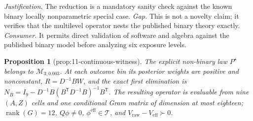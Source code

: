 \documentclass{article}
\newtheorem{proposition}{Proposition}
\begin{document}
\par\smallskip\noindent \textit{Justification.} The reduction is a mandatory sanity check against the known binary locally nonparametric special case. \textit{Gap.} This is not a novelty claim; it verifies that the multilevel operator nests the published binary theory exactly. \textit{Consumer.} It permits direct validation of software and algebra against the published binary model before analyzing six exposure levels.

\begin{proposition}[prop:11-continuous-witness]\label{prop:11-continuous-witness}
The explicit non-binary law \(P^{\star}\) belongs to \(\mathcal M_{3,0.003}\). At each outcome bin its posterior weights are positive and nonconstant, \(R=D^{-1}BW\), and the exact first elimination is \(N_B=I_9-D^{-1}B(B^{\mathsf T}D^{-1}B)^{-1}B^{\mathsf T}\). The resulting operator is evaluable from nine \((A,Z)\) cells and one conditional Gram matrix of dimension at most eighteen; \(\operatorname{rank}(G)=12\), \(Q\phi\neq0\), \(\phi^{\mathrm{eff}}\in\mathcal T\), and \(V_{\mathrm{raw}}-V_{\mathrm{eff}}\succ0\).
\end{proposition}
\end{document}
